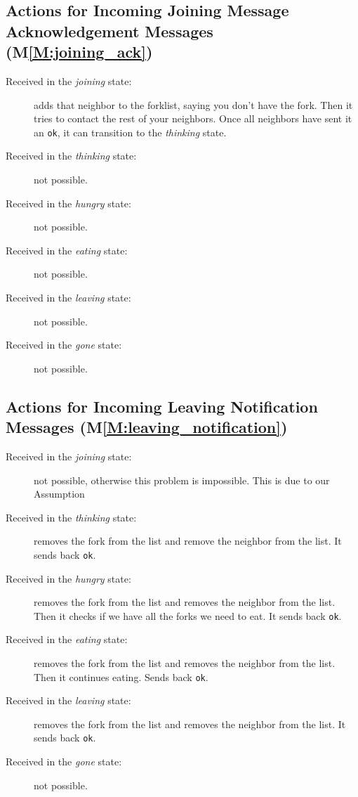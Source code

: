 \documentclass[11pt]{article}
\begin{document}
\subsection{Actions for Incoming Joining Message Acknowledgement Messages (M\ref{M:joining_ack})}
\begin{description}
\item[Received in the \textit{joining} state:] adds that neighbor to the forklist, saying you don't have the fork. Then it tries to contact the rest of your neighbors. Once all neighbors have sent it an \texttt{ok}, it can transition to the \emph{thinking} state.
\item[Received in the \textit{thinking} state:] not possible.
\item[Received in the \textit{hungry} state:] not possible.
\item[Received in the \textit{eating} state:] not possible.
\item[Received in the \textit{leaving} state:] not possible.
\item[Received in the \textit{gone} state:] not possible.
\end{description}

\subsection{Actions for Incoming Leaving Notification Messages (M\ref{M:leaving_notification})}
\begin{description}
\item[Received in the \textit{joining} state:] not possible, otherwise this problem is impossible. This is due to our Assumption
\item[Received in the \textit{thinking} state:] removes the fork from the list and remove the neighbor from the list. It sends back \texttt{ok}.
\item[Received in the \textit{hungry} state:] removes the fork from the list and removes the neighbor from the list. Then it checks if we have all the forks we need to eat. It sends back \texttt{ok}.
\item[Received in the \textit{eating} state:] removes the fork from the list and removes the neighbor from the list. Then it continues eating. Sends back \texttt{ok}.
\item[Received in the \textit{leaving} state:] removes the fork from the list and removes the neighbor from the list. It sends back \texttt{ok}.
\item[Received in the \textit{gone} state:] not possible.
\end{description}
\end{document}
